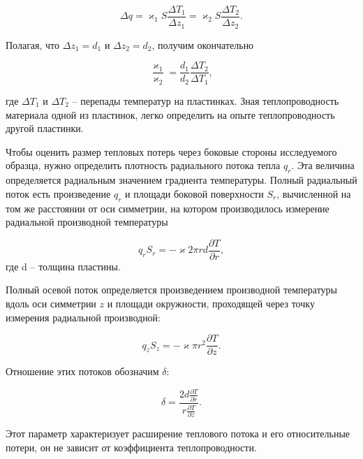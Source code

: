 \documentclass[a4paper, 12pt]{article}
\begin{document}
\begin{equation}
    \label{delta_q_experimental}
    \Delta q = \varkappa_{1} S \frac{\Delta T_1}{\Delta z_1} = \varkappa_2 S \frac{\Delta T_2}{\Delta z_2}.
\end{equation}

Полагая, что $ \Delta z_1 = d_1 $ и $ \Delta z_2 = d_2 $, получим окончательно

\begin{equation}
    \label{final_formula}
    \frac{\varkappa_1}{\varkappa_2} = \frac{d_1}{d_2}\frac{\Delta T_2}{\Delta T_1},
\end{equation}

где $ \Delta T_1 $ и $ \Delta T_2 $ -- перепады температур на пластинках. Зная теплопроводность материала одной из пластинок, легко определить на опыте теплопроводность другой пластинки.

Чтобы оценить размер тепловых потерь через боковые стороны исследуемого образца, нужно определить плотность радиального потока тепла $q_r$. Эта величина определяется радиальным значением градиента температуры. Полный радиальный поток есть произведение $q_r$ и площади боковой поверхности $S_r$, вычисленной на том же расстоянии от оси симметрии, на котором производилось измерение радиальной производной температуры

\begin{equation}
    \label{losses_1}
    q_r S_r = - \varkappa 2 \pi rd \frac{\partial T}{\partial r},
\end{equation}
где d -- толщина пластины.

Полный осевой поток определяется произведением производной температуры вдоль оси симметрии $z$ и площади окружности, проходящей через точку измерения радиальной производной:

\begin{equation}
    \label{losses_2}
    q_z S_z = - \varkappa \pi r^2 \frac{\partial T}{\partial z}.
\end{equation}

Отношение этих потоков обозначим $ \delta $:

\begin{equation}
    \label{losses_3}
    \delta = \frac{2d \frac{\partial T}{\partial r}}{r \frac{\partial T}{\partial z}}.
\end{equation}

Этот параметр характеризует расширение теплового потока и его относительные потери, он не зависит от коэффициента теплопроводности.
\end{document}
